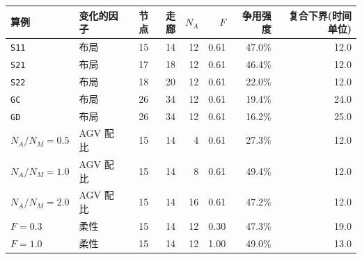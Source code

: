 \begin{tabular}{@{}llrrrrrr@{}}
\toprule
算例 & 变化的因子 & 节点 & 走廊 & $N_A$ & $F$ & 争用强度 & 复合下界(时间单位) \\
\midrule
\texttt{S11} & 布局 & 15 & 14 & 12 & 0.61 & 47.0\% & 12.0 \\
\texttt{S21} & 布局 & 17 & 18 & 12 & 0.61 & 46.4\% & 12.0 \\
\texttt{S22} & 布局 & 18 & 20 & 12 & 0.61 & 22.0\% & 12.0 \\
\texttt{GC} & 布局 & 26 & 34 & 12 & 0.61 & 19.4\% & 24.0 \\
\texttt{GD} & 布局 & 26 & 34 & 12 & 0.61 & 16.2\% & 25.0 \\
\midrule
$N_A/N_M=0.5$ & AGV 配比 & 15 & 14 & 4 & 0.61 & 27.3\% & 12.0 \\
$N_A/N_M=1.0$ & AGV 配比 & 15 & 14 & 8 & 0.61 & 49.4\% & 12.0 \\
$N_A/N_M=2.0$ & AGV 配比 & 15 & 14 & 16 & 0.61 & 47.2\% & 12.0 \\
\midrule
$F=0.3$ & 柔性 & 15 & 14 & 12 & 0.30 & 47.3\% & 19.0 \\
$F=1.0$ & 柔性 & 15 & 14 & 12 & 1.00 & 49.0\% & 13.0 \\
\bottomrule
\end{tabular}
